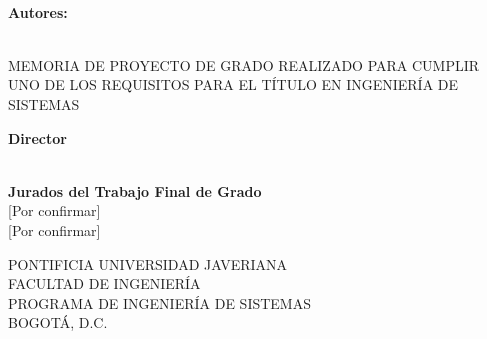 \setcounter{page}{1}

    \begin{center}

        \large
        \codigoproyecto \\

        \vspace{0.5cm}
        \LARGE
        
        \large
        \thetitle
        
        \vspace{0.5cm}
        \LARGE


        \vspace{0.5cm}

        \large
        \textbf{Autores:}\\
        \vspace{0.2cm}
        \theauthor \\
        
        \vspace{0.5cm}
        \LARGE


        \large
        \vspace{0.5cm}
         MEMORIA DE PROYECTO DE GRADO REALIZADO PARA CUMPLIR UNO DE LOS REQUISITOS PARA EL TÍTULO EN INGENIERÍA DE SISTEMAS \\

        \vspace{0.5cm}
        \LARGE


        \vspace{0.5cm}

        \large
        \textbf{Director}\\
        \vspace{0.2cm}
        \director\\

        \vspace{0.5cm}
        \LARGE


        \vspace{0.5cm}

        \large
        \textbf{Jurados del Trabajo Final de Grado}\\
        \vspace{0.2cm}
        {[Por confirmar]} \\
        {[Por confirmar]} \\

        \vspace{0.5cm}
        \LARGE


        \vspace{1cm}

         \large
        PONTIFICIA UNIVERSIDAD JAVERIANA \\
        \vspace{0.5cm}
        FACULTAD DE INGENIERÍA \\
        \vspace{0.5cm}
        PROGRAMA DE INGENIERÍA DE SISTEMAS \\
        \vspace{0.5cm}
        BOGOTÁ, D.C. \\
        \vspace{0.5cm}
        \anioproyecto
        
    \end{center}